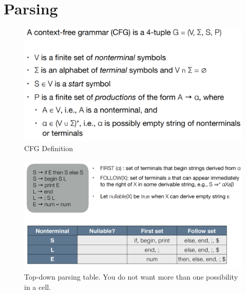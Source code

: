 \documentclass{article}
\begin{document}
\section{Parsing}

\begin{figure}[h]
    \centering
    \includegraphics[scale=0.35]{assets/cfg_def.png}
    \caption{CFG Definition}
    \label{fig:cfg}
\end{figure}

\begin{figure}[h]
    \centering
    \includegraphics[scale=0.35]{assets/top-down_parsing_table.png}
    \caption{Top-down parsing table. You do not want more than one possibility in a cell.}
    \label{fig:top-down}
\end{figure}
\end{document}
